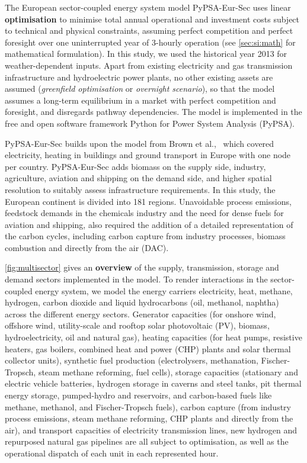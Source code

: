 The European sector-coupled energy system model PyPSA-Eur-Sec uses linear
\textbf{optimisation} to minimise total annual operational and investment costs
subject to technical and physical constraints, assuming perfect competition and
perfect foresight over one uninterrupted year of 3-hourly operation (see
\cref{sec:si:math} for mathematical formulation). In this study, we used the
historical year 2013 for weather-dependent inputs. Apart from existing
electricity and gas transmission infrastructure and hydroelectric power plants,
no other existing assets are assumed (\textit{greenfield optimisation} or
\textit{overnight scenario}), so that the model assumes a long-term equilibrium
in a market with perfect competition and foresight, and disregards pathway
dependencies. The model is implemented in the free and open
software framework Python for Power System Analysis
(PyPSA).\cite{brownPyPSAPython2018}

PyPSA-Eur-Sec builds upon the model from Brown et
al.,~\cite{brownSynergiesSector2018} which covered electricity, heating in
buildings and ground transport in Europe with one node per country.
PyPSA-Eur-Sec adds biomass on the supply side, industry, agriculture, aviation
and shipping on the demand side, and higher spatial resolution to suitably
assess infrastructure requirements. In this study, the European continent is
divided into 181 regions. Unavoidable process emissions, feedstock demands in
the chemicals industry and the need for dense fuels for aviation and shipping,
also required the addition of a detailed representation of the carbon cycles,
including carbon capture from industry processes, biomass combustion and
directly from the air (DAC).

\cref{fig:multisector} gives an \textbf{overview} of the supply, transmission,
storage and demand sectors implemented in the model. To render interactions in
the sector-coupled energy system, we model the energy carriers electricity,
heat, methane, hydrogen, carbon dioxide and liquid hydrocarbons (oil, methanol,
naphtha) across the different energy sectors. Generator capacities (for onshore
wind, offshore wind, utility-scale and rooftop solar photovoltaic (PV), biomass,
hydroelectricity, oil and natural gas), heating capacities (for heat pumps,
resistive heaters, gas boilers, combined heat and power (CHP) plants and solar
thermal collector units), synthetic fuel production (electrolysers, methanation,
Fischer-Tropsch, steam methane reforming, fuel cells), storage capacities
(stationary and electric vehicle batteries, hydrogen storage in caverns and
steel tanks, pit thermal energy storage, pumped-hydro and reservoirs, and
carbon-based fuels like methane, methanol, and Fischer-Tropsch fuels), carbon
capture (from industry process emissions, steam methane reforming, CHP plants
and directly from the air), and transport capacities of electricity transmission
lines, new hydrogen and repurposed natural gas pipelines are all subject to
optimisation, as well as the operational dispatch of each unit in each
represented hour.


